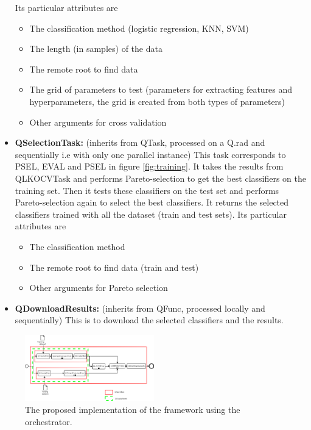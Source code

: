 \documentclass[10pt, conference, compsocconf]{IEEEtran}
\begin{document}
\begin{itemize}
  Its particular attributes are
  \begin{itemize}
  \item The classification method (logistic regression, KNN, SVM)
  \item The length (in samples) of the data
  \item The remote root to find data
  \item The grid of parameters to test (parameters for extracting features and hyperparameters, the grid is created from both types of parameters)
  \item Other arguments for cross validation
  \end{itemize}
\item \textbf{QSelectionTask:} (inherits from QTask, processed on a Q.rad and sequentially i.e with only one parallel instance) This task corresponds to PSEL, EVAL and PSEL in figure \ref{fig:training}. It takes the results from QLKOCVTask and performs Pareto-selection to get the best classifiers on the training set. Then it tests these classifiers on the test set and performs Pareto-selection again to select the best classifiers. It returns the selected classifiers trained with all the dataset (train and test sets).
  Its particular attributes are
  \begin{itemize}
  \item The classification method
  \item The remote root to find data (train and test)
  \item Other arguments for Pareto selection
  \end{itemize}
\item \textbf{QDownloadResults:} (inherits from QFunc, processed locally and sequentially) This is to download the selected classifiers and the results.
\end{itemize}
\begin{figure}[H]
\centering
\includegraphics[width=0.5\textwidth]{Figures/implementation.png}
\caption{The proposed implementation of the framework using the orchestrator.}
\label{fig:implementation_diagram}
\end{figure}
\end{document}
